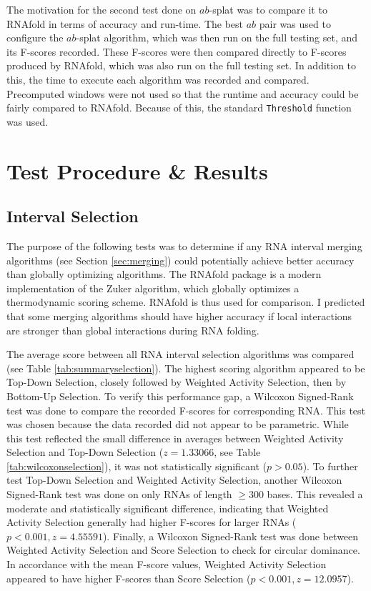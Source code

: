 \documentclass{cshonours}
\begin{document}
The motivation for the second test done on $ab$-splat was to compare it to RNAfold in terms of accuracy and run-time. The best $ab$ pair was used to configure the $ab$-splat algorithm, which was then run on the full testing set, and its F-scores recorded. These F-scores were then compared directly to F-scores produced by RNAfold, which was also run on the full testing set. In addition to this, the time to execute each algorithm was recorded and compared. Precomputed windows were not used so that the runtime and accuracy could be fairly compared to RNAfold. Because of this, the standard \texttt{Threshold} function was used.


\section{Test Procedure \& Results}

\subsection{Interval Selection}
The purpose of the following tests was to determine if any RNA interval merging algorithms (see Section \ref{sec:merging}) could potentially achieve better accuracy than globally optimizing algorithms. The RNAfold package is a modern implementation of the Zuker algorithm, which globally optimizes a thermodynamic scoring scheme. RNAfold is thus used for comparison. I predicted that some merging algorithms should have higher accuracy if local interactions are stronger than global interactions during RNA folding.

The average score between all RNA interval selection algorithms was compared (see Table \ref{tab:summaryselection}). The highest scoring algorithm appeared to be Top-Down Selection, closely followed by Weighted Activity Selection, then by Bottom-Up Selection. To verify this performance gap, a Wilcoxon Signed-Rank test was done to compare the recorded F-scores for corresponding RNA. This test was chosen because the data recorded did not appear to be parametric. While this test reflected the small difference in averages between Weighted Activity Selection and Top-Down Selection ($z = 1.33066$, see Table \ref{tab:wilcoxonselection}), it was not statistically significant ($p > 0.05$). To further test Top-Down Selection and Weighted Activity Selection, another Wilcoxon Signed-Rank test was done on only RNAs of length $\geq 300$ bases. This revealed a moderate and statistically significant difference, indicating that Weighted Activity Selection generally had higher F-scores for larger RNAs ($p < 0.001, z = 4.55591$). Finally, a Wilcoxon Signed-Rank test was done between Weighted Activity Selection and Score Selection to check for circular dominance. In accordance with the mean F-score values, Weighted Activity Selection appeared to have higher F-scores than Score Selection ($p < 0.001, z = 12.0957$).
\end{document}
